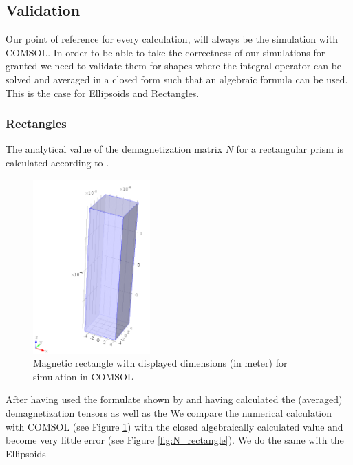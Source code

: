 \subsection{Validation}
Our point of reference for every calculation, will always be the simulation with COMSOL. In order to be able to take the correctness of our simulations for granted we need to validate them for shapes where the integral operator can be solved and averaged in a closed form such that an algebraic formula can be used. This is the case for Ellipsoids and Rectangles.

\subsubsection{Rectangles}
The analytical value of the demagnetization matrix $N$ for a rectangular prism is calculated according to \cite{Aharoni1998}. \\

\begin{figure}[ht]
	\centering
  \includegraphics[width=0.4\textwidth]{Pictures/rectangle.png}
	\caption{Magnetic rectangle with displayed dimensions (in meter) for simulation in COMSOL}
	\label{fig:rectangle}
\end{figure}

After having used the formulate shown by \cite{Aharoni1998} and having calculated the (averaged) demagnetization tensors as well as the We compare the numerical calculation with COMSOL (see Figure \ref{fig:rectangle}) with the closed algebraically calculated value and become very little error (see Figure \ref{fig:N_rectangle}). We do the same with the Ellipsoids

